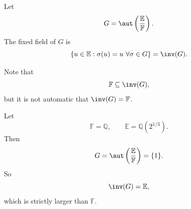 \begin{definition}
    Let
    \[
        G=\aut\left(\frac{\mathbb{E}}{\mathbb{F}}\right).
    \]
    The fixed field of $G$ is
    \[
        \{u\in \mathbb{E}:\sigma(u)=u\ \forall \sigma\in G\}
        =
        \inv(G).
    \]
\end{definition}

Note that
\[
    \mathbb{F}\subseteq \inv(G),
\]
but it is not automatic that $\inv(G)=\mathbb{F}$.

\begin{example}
    Let
    \[
        \mathbb{F}=\mathbb{Q},
        \qquad
        \mathbb{E}=\mathbb{Q}(2^{1/3}).
    \]
    Then
    \[
        G=\aut\left(\frac{\mathbb{E}}{\mathbb{F}}\right)=\{1\}.
    \]
    So
    \[
        \inv(G)=\mathbb{E},
    \]
    which is strictly larger than $\mathbb{F}$.
\end{example}

